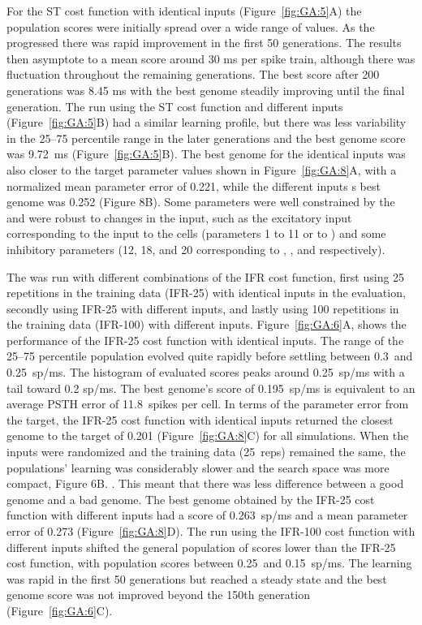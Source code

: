 For the ST cost function with identical {\ANF} inputs
(Figure~\ref{fig:GA:5}A) the population scores were initially spread over
a wide range of values. As the {\GA} progressed there was rapid
improvement in the first 50 generations. The results then asymptote to
a mean score around 30 ms per spike train, although there was
fluctuation throughout the remaining generations.  The best score
after 200 generations was 8.45 ms with the best genome steadily
improving until the final generation.  The {\GA} run using the ST cost
function and different {\ANF} inputs (Figure~\ref{fig:GA:5}B) had a similar
learning profile, but there was less variability in the 25--75
percentile range in the later generations and the best genome score
was 9.72~ms (Figure~\ref{fig:GA:5}B).  The best genome for the identical
inputs was also closer to the target parameter values shown in
Figure~\ref{fig:GA:8}A, with a normalized mean parameter error of 0.221,
while the different inputs {\GA}s best genome was 0.252 (Figure
8B). Some parameters were well constrained by the {\GA} and were robust
to changes in the input, such as the excitatory input corresponding to
the {\ANF} input to the {\CN} cells (parameters 1 to 11 or \wANFTS to
\wLSRGLG) and some inhibitory parameters (12, 18, and 20 corresponding
to \wDSTS, \wGLGTS, and \sGLGTS respectively).

\smallskip{} 

The {\GA} was run with different combinations of the IFR cost function,
first using 25 repetitions in the training data (IFR-25) with
identical {\ANF} inputs in the {\GA} evaluation, secondly using IFR-25 with
different {\ANF} inputs, and lastly using 100 repetitions in the training
data (IFR-100) with different {\ANF} inputs. Figure~\ref{fig:GA:6}A, shows
the {\GA} performance of the IFR-25 cost function with identical
inputs. The range of the 25--75 percentile population evolved quite
rapidly before settling between 0.3~and 0.25~sp/ms.  The histogram of
evaluated scores peaks around 0.25~sp/ms with a tail toward 0.2 sp/ms.
The best genome's score of 0.195~sp/ms is equivalent to an average
PSTH error of 11.8~spikes per cell. In terms of the parameter error
from the target, the IFR-25 cost function with identical inputs
returned the closest genome to the target of 0.201
(Figure~\ref{fig:GA:8}C) for all {\GA} simulations. When the inputs were
randomized and the training data (25~reps) remained the same, the {\GA}
populations' learning was considerably slower and the search space was
more compact, Figure 6B. . This meant that there was less difference between a good
genome and a bad genome.  The best genome obtained by the IFR-25 cost
function with different inputs had a score of 0.263~sp/ms and a mean
parameter error of 0.273 (Figure~\ref{fig:GA:8}D). The {\GA} run using the
IFR-100 cost function with different inputs shifted the general
population of {\GA} scores lower than the IFR-25 cost function, with
population scores between 0.25~and 0.15~sp/ms. The learning was rapid
in the first 50 generations but reached a steady state and the best
genome score was not improved beyond the 150th generation
(Figure~\ref{fig:GA:6}C).  %

